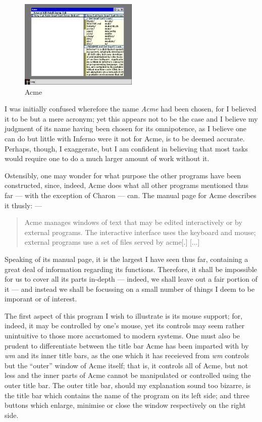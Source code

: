 \documentclass[a5paper,twoside,12pt]{report}
\begin{document}
    \begin{figure}
      \centering
      \includegraphics[width=0.5\textwidth]{imgs/acme.png}
      \caption{Acme}
    \end{figure}

    I was initially confused wherefore the name \textit{Acme} had been chosen, for I believed it to be but a mere acronym; yet this appears not to be the case and I believe my judgment of its name having been chosen for its omnipotence, as I believe one can do but little with Inferno were it not for Acme, is to be deemed accurate. Perhaps, though, I exaggerate, but I am confident in believing that most tasks would require one to do a much larger amount of work without it.

    Ostensibly, one may wonder for what purpose the other programs have been constructed, since, indeed, Acme does what all other programs mentioned thus far — with the exception of Charon — can. The manual page for Acme describes it thusly: —

    \begin{quote}
        Acme manages windows of text that may be edited interactively or by external programs. The interactive interface uses the keyboard and mouse; external programs use a set of files served by acme[.] [...]
   \end{quote}

   Speaking of its manual page, it is the largest I have seen thus far, containing a great deal of information regarding its functions. Therefore, it shall be impossible for us to cover all its parts in-depth — indeed, we shall leave out a fair portion of it — and instead we shall be focussing on a small number of things I deem to be imporant or of interest.

   The first aspect of this program I wish to illustrate is its mouse support; for, indeed, it may be controlled by one's mouse, yet its controls may seem rather unintuitive to those more accustomed to modern systems. One must also be prudent to differentiate between the title bar Acme has been imparted with by \textit{wm} and its inner title bars, as the one which it has receieved from \textit{wm} controls but the ``outer'' window of Acme itself; that is, it controls all of Acme, but not less and the inner parts of Acme cannot be manipulated or controlled using the outer title bar. The outer title bar, should my explanation sound too bizarre, is the title bar which contains the name of the program on its left side; and three buttons which enlarge, minimise or close the window respectively on the right side.
\end{document}

